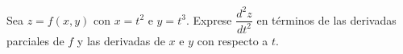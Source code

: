 Sea $z = f(x, y)$ con $x = t^2$ e $y = t^3$. Exprese $\dfrac{d^2 z}{dt^2}$ en términos de las derivadas parciales de $f$ y las derivadas de $x$ e $y$ con respecto a $t$.
